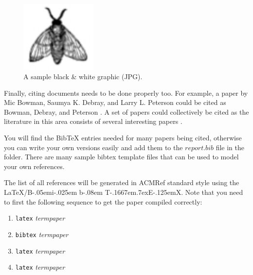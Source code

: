 \documentclass{sig-alternate}
\def\BibTeX{{\rm B\kern-.05em{\sc i\kern-.025em b}\kern-.08em
    T\kern-.1667em\lower.7ex\hbox{E}\kern-.125emX}}
\begin{document}
\begin{figure}[htb]
\label{sample graphic}
\begin{center}
\includegraphics[width=1.5in]{fly.jpg}
\caption{A sample black \& white graphic (JPG).}
\end{center}
\end{figure}

Finally, citing documents needs to be done properly too. For
example, a paper by Mic Bowman, Saumya K. Debray, and Larry
L. Peterson could be cited as Bowman, Debray, and Peterson
\cite{bowman:reasoning}. A set of papers could collectively
be cited as the literature in this area consists of several
interesting papers
\cite{braams:babel,clark:pct,herlihy:methodology}.

You will find the BibTeX entries needed for many papers being cited,
otherwise you can write your own versions easily and add them to the
$report.bib$ file in the folder. There are many sample bibtex
template files that can be used to model your own references.

The list of all references will be generated in ACMRef
standard style using the \LaTeX{}/\BibTeX{}. Note that you
need to first the following sequence to get the paper
compiled correctly:

\begin{enumerate}
\item {\tt latex} {\em termpaper}
\item {\tt bibtex} {\em termpaper}
\item {\tt latex} {\em termpaper}
\item {\tt latex} {\em termpaper}
\end{enumerate}



\balance
\end{document}
